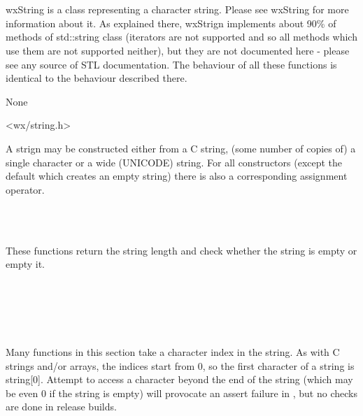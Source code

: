 \section{}\label{wxstring}

wxString is a class representing a character string. Please see wxString 
 for more information about it. As explained
there, wxStrign implements about 90\% of methods of std::string class (iterators
are not supported and so all methods which use them are not supported neither),
but they are not documented here - please see any source of STL documentation.
The behaviour of all these functions is identical to the behaviour described
there.


None


<wx/string.h>





A strign may be constructed either from a C string, (some number of copies of)
a single character or a wide (UNICODE) string. For all constructors (except the
default which creates an empty string) there is also a corresponding assignment
operator.

\\
\\


These functions return the string length and check whether the string is empty
or empty it.

\\
\\
\\
\\


Many functions in this section take a character index in the string. As with C
strings and/or arrays, the indices start from $0$, so the first character of a
string is string[$0$]. Attempt to access a character beyond the end of the
string (which may be even $0$ if the string is empty) will provocate an assert
failure in , but no checks are done in
release builds.

